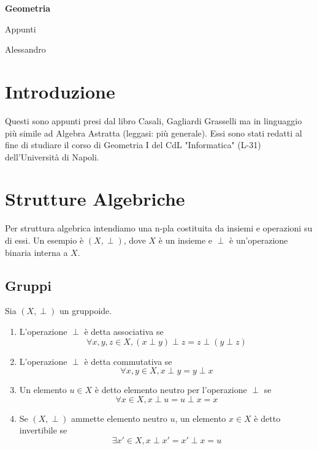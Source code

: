 \documentclass[11pt,a4paper]{article}
\theoremstyle{plain}
\theoremstyle{remark}
\theoremstyle{definition}
\theoremstyle{definition}
\theoremstyle{plain}
\begin{document}
	
	\begin{center}
		
		{\LARGE\bfseries Geometria}
		
		\vspace{0.3cm}
		
		{\large Appunti}
		
		\vspace{0.2cm}
		
		Alessandro
		
	\end{center}
	
	\vspace{0.5cm}
	
	\tableofcontents
	
	\newpage
	
	
	\section{Introduzione}
	
	Questi sono appunti presi dal libro Casali, Gagliardi Grasselli ma in linguaggio più simile ad Algebra Astratta (leggasi: più generale). Essi sono stati redatti al fine di studiare il corso di Geometria I del CdL "Informatica" (L-31) dell'Università di Napoli.
	
	\section{Strutture Algebriche}
	Per struttura algebrica intendiamo una n-pla costituita da insiemi e operazioni su di essi.
	Un esempio è $(X, \perp)$, dove $X$ è un insieme e $\perp$ è un'operazione binaria interna a $X$.
	
	\subsection{Gruppi}
	Sia $(X, \perp)$ un gruppoide.
	
	\begin{enumerate}[label=\roman*)]
		\item L'operazione $\perp$ è detta associativa se
		$$\forall x,y,z \in X, (x \perp y) \perp z = z \perp (y \perp z)$$
		
		\item L'operazione $\perp$ è detta commutativa se
		$$ \forall x,y \in X, x \perp y = y \perp x $$
		
		\item Un elemento $u \in X$ è detto elemento neutro per l'operazione $\perp$ se
		$$ \forall x \in X, x \perp u = u \perp x = x $$ 
		
		\item Se $(X, \perp)$ ammette elemento neutro $u$, un elemento $x \in X$ è detto invertibile se
		$$ \exists x' \in X, x \perp x' = x' \perp x = u $$
	\end{enumerate}
	
\end{document}

